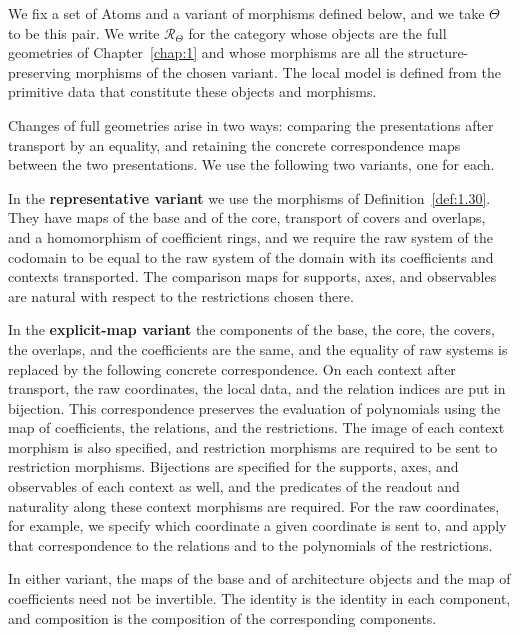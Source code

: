 \begin{construction}\label{cons:8.13}

We fix a set of Atoms and a variant of morphisms defined below, and we take $\Theta$ to be
this pair.
We write $\mathcal{R}_\Theta$ for the category whose objects are the full geometries of
Chapter~\ref{chap:1} and whose morphisms are all the structure-preserving morphisms of the
chosen variant.
The local model is defined from the primitive data that constitute these objects and
morphisms.

Changes of full geometries arise in two ways: comparing the presentations after
transport by an equality, and retaining the concrete correspondence maps between
the two presentations. We use the following two variants, one for each.

\end{construction}

\begin{definition}\label{def:8.14}

In the \textbf{representative variant} we use the morphisms of Definition~\ref{def:1.30}.
They have maps of the base and of the core, transport of covers and overlaps, and a
homomorphism of coefficient rings, and we require the raw system of the codomain to be equal
to the raw system of the domain with its coefficients and contexts transported.
The comparison maps for supports, axes, and observables are natural with respect to the
restrictions chosen there.

In the \textbf{explicit-map variant} the components of the base, the core, the covers, the
overlaps, and the coefficients are the same, and the equality of raw systems is replaced by
the following concrete correspondence.
On each context after transport, the raw coordinates, the local data, and the relation
indices are put in bijection.
This correspondence preserves the evaluation of polynomials using the map of coefficients,
the relations, and the restrictions.
The image of each context morphism is also specified, and restriction morphisms are required
to be sent to restriction morphisms.
Bijections are specified for the supports, axes, and observables of each context as well, and
the predicates of the readout and naturality along these context morphisms are required.
For the raw coordinates, for example, we specify which coordinate a given coordinate is sent
to, and apply that correspondence to the relations and to the polynomials of the
restrictions.

In either variant, the maps of the base and of architecture objects and the map of
coefficients need not be invertible.
The identity is the identity in each component, and composition is the composition of the
corresponding components.

\end{definition}

